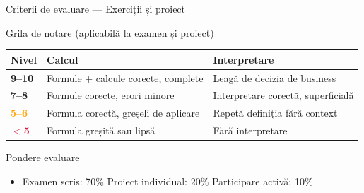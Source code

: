 \documentclass[9pt, aspectratio=169, t]{beamer}
\theoremstyle{definition}
\begin{document}
\begin{frame}{Criterii de evaluare --- Exerciții și proiect}
\begin{block}{Grila de notare (aplicabilă la examen și proiect)}
\small
\renewcommand{\arraystretch}{1.2}
\begin{center}
\begin{tabular}{lll}
\toprule
\textbf{Nivel} & \textbf{Calcul} & \textbf{Interpretare} \\
\midrule
\textcolor{Forest}{\textbf{9--10}} & Formule + calcule corecte, complete & Leagă de decizia de business \\
\textcolor{Amber}{\textbf{7--8}} & Formule corecte, erori minore & Interpretare corectă, superficială \\
\textcolor{Orange}{\textbf{5--6}} & Formula corectă, greșeli de aplicare & Repetă definiția fără context \\
\textcolor{Crimson}{\textbf{$<$5}} & Formula greșită sau lipsă & Fără interpretare \\
\bottomrule
\end{tabular}
\end{center}
\end{block}
\begin{alertblock}{Pondere evaluare}
\begin{itemize}\setlength\itemsep{0pt}
\item Examen scris: 70\% \quad Proiect individual: 20\% \quad Participare activă: 10\%
\end{itemize}
\end{alertblock}
\end{frame}
\end{document}
